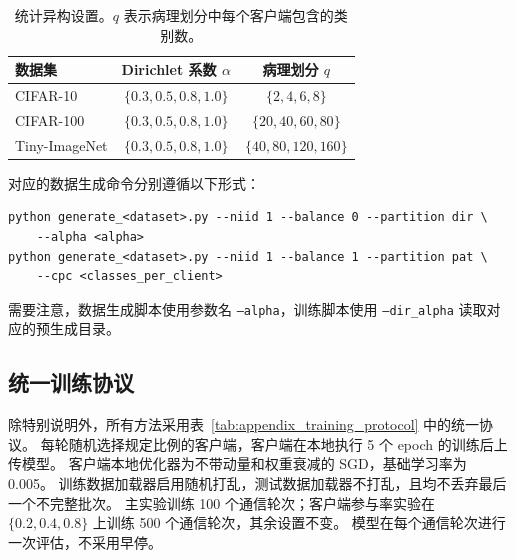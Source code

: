 \begin{table}[t]
\centering
\caption{统计异构设置。$q$ 表示病理划分中每个客户端包含的类别数。}
\label{tab:appendix_partition}
\small
\setlength{\tabcolsep}{5pt}
\renewcommand{\arraystretch}{1.10}
\begin{tabular}{lcc}
\toprule
\textbf{数据集} & \textbf{Dirichlet 系数 $\alpha$} & \textbf{病理划分 $q$} \\
\midrule
CIFAR-10 & $\{0.3,0.5,0.8,1.0\}$ & $\{2,4,6,8\}$ \\
CIFAR-100 & $\{0.3,0.5,0.8,1.0\}$ & $\{20,40,60,80\}$ \\
Tiny-ImageNet & $\{0.3,0.5,0.8,1.0\}$ & $\{40,80,120,160\}$ \\
\bottomrule
\end{tabular}
\end{table}

对应的数据生成命令分别遵循以下形式：
\begin{verbatim}
python generate_<dataset>.py --niid 1 --balance 0 --partition dir \
    --alpha <alpha>
python generate_<dataset>.py --niid 1 --balance 1 --partition pat \
    --cpc <classes_per_client>
\end{verbatim}
需要注意，数据生成脚本使用参数名 \texttt{--alpha}，训练脚本使用
\texttt{--dir\_alpha} 读取对应的预生成目录。



\subsection{统一训练协议}

除特别说明外，所有方法采用表~\ref{tab:appendix_training_protocol} 中的统一协议。
每轮随机选择规定比例的客户端，客户端在本地执行 5 个 epoch 的训练后上传模型。
客户端本地优化器为不带动量和权重衰减的 SGD，基础学习率为 0.005。
训练数据加载器启用随机打乱，测试数据加载器不打乱，且均不丢弃最后一个不完整批次。
主实验训练 100 个通信轮次；客户端参与率实验在
$\{0.2,0.4,0.8\}$ 上训练 500 个通信轮次，其余设置不变。
模型在每个通信轮次进行一次评估，不采用早停。

